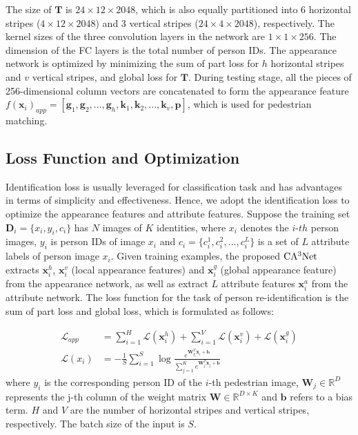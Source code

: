 \documentclass[sigconf]{acmart}
\begin{document}
The size of $\boldsymbol{T}$ is $24\times12\times2048$, which is also equally partitioned into 6 horizontal stripes ($4\times12\times2048$) and 3 vertical stripes ($24\times4\times2048$), respectively. The kernel sizes of the three convolution layers in the network are $1\times1\times256$. The dimension of the FC layers is the total number of person IDs. The appearance network is optimized by minimizing the sum of part loss for $h$ horizontal stripes and $v$ vertical stripes, and global loss for $\boldsymbol{T}$. During testing stage, all the pieces of 256-dimensional column vectors are concatenated to form the appearance feature $f(\boldsymbol{x}_i)_{app} = [\boldsymbol{g}_1, \boldsymbol{g}_2,..., \boldsymbol{g}_h, \boldsymbol{k}_1, \boldsymbol{k}_2,..., \boldsymbol{k}_v, \boldsymbol{p}]$, which is used for pedestrian matching.

\subsection{Loss Function and Optimization}
Identification loss is usually leveraged for classification task and has advantages in terms of simplicity and effectiveness.  Hence, we adopt the identification loss to optimize the appearance features and attribute features. Suppose the training set $\boldsymbol{D}_i = \{x_i, y_i, c_i\}$ has $N$ images of $K$ identities, where $x_i$ denotes the $i$-$th$ person images, $y_i$ is person IDs of image $x_i$ and $c_i = \{c_i^1, c_i^2, ..., c_i^L\}$ is a set of $L$ attribute labels of person image $x_i$. Given training examples, the proposed $\rm CA^3Net$ extracts $\boldsymbol{x}_i^h$, $\boldsymbol{x}_i^v$ (local appearance features) and  $\boldsymbol{x}_i^g$ (global appearance feature) from the appearance network, as well as extract $L$ attribute features $\boldsymbol{x}_i^a$ from the attribute network. The loss function for the task of person re-identification is the sum of part loss and global loss, which is formulated as follows:

\begin{equation}
\begin{split}
\mathcal{L}_{app} &= \sum\limits_{i=1}^{H}\mathcal{L}(\boldsymbol{x}_i^h) + \sum\limits_{i=1}^{V}\mathcal{L}(\boldsymbol{x}_i^v) + \mathcal{L}(\boldsymbol{x}_i^g)\\
\mathcal{L}(x_i)& = -\frac{1}{S}\sum\limits_{i=1}^{S}\log{\frac{e^{\boldsymbol{W}^T_{y_i}\boldsymbol{x}_i+\boldsymbol{b}}}{\sum_{j=1}^Ke^{\boldsymbol{W}^T_j\boldsymbol{x}_j+\boldsymbol{b}}}}
\end{split}
\end{equation}
where $y_i$ is the corresponding person ID of the $i$-th pedestrian image, $\boldsymbol{W}_j\in \mathbb{R}^D$ represents the j-th column of the weight matrix $\boldsymbol{W}\in\mathbb{R}^{D\times K}$ and $\boldsymbol{b}$ refers to a bias term. $H$ and $V$ are the number of horizontal stripes and vertical stripes, respectively. The batch size of the input is $S$.
\end{document}
